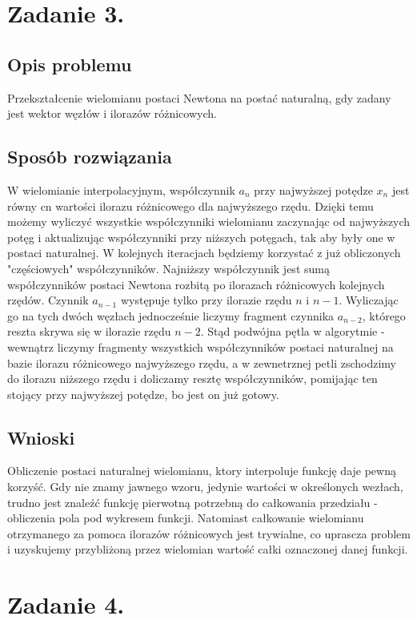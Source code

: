 \documentclass[12pt]{article}
\begin{document}
\section{Zadanie 3.}

\subsection{Opis problemu}
Przekształcenie wielomianu postaci Newtona na postać naturalną, gdy zadany jest wektor węzłów i ilorazów różnicowych.
\subsection{Sposób rozwiązania}
W wielomianie interpolacyjnym, współczynnik $a_n$ przy najwyższej potędze $x_n$ jest równy cn wartości ilorazu różnicowego dla najwyższego rzędu. 
Dzięki temu możemy wyliczyć wszystkie współczynniki wielomianu zaczynając od najwyższych potęg i 
aktualizując współczynniki przy niższych potęgach, tak aby były one w postaci naturalnej. 
W kolejnych iteracjach będziemy korzystać z już obliczonych "częściowych" współczynników. Najniższy współczynnik jest sumą współczynników postaci Newtona
rozbitą po ilorazach różnicowych kolejnych rzędów. Czynnik $a_{n-1}$ występuje tylko przy ilorazie rzędu $n$ i $n-1$. Wyliczając go na tych dwóch węzłach jednocześnie 
liczymy fragment czynnika $a_{n-2}$, którego reszta skrywa się w ilorazie rzędu $n-2$. 
Stąd podwójna pętla w algorytmie - wewnątrz liczymy fragmenty wszystkich współczynników postaci 
naturalnej na bazie ilorazu różnicowego najwyższego rzędu, a w zewnetrznej petli zschodzimy do ilorazu niższego rzędu i doliczamy resztę współczynników, pomijając 
ten stojący przy najwyższej potędze, bo jest on już gotowy.
\subsection{Wnioski}
Obliczenie postaci naturalnej wielomianu, ktory interpoluje funkcję daje pewną korzyść. 
Gdy nie znamy jawnego wzoru, jedynie
wartości w określonych wezłach, trudno jest znaleźć funkcję pierwotną
potrzebną do całkowania przedziału - obliczenia pola pod wykresem funkcji.
Natomiast całkowanie wielomianu otrzymanego za pomoca ilorazów różnicowych jest trywialne, co uprascza problem i uzyskujemy przybliżoną przez wielomian wartość całki oznaczonej danej funkcji.

\section{Zadanie 4.}
\end{document}

